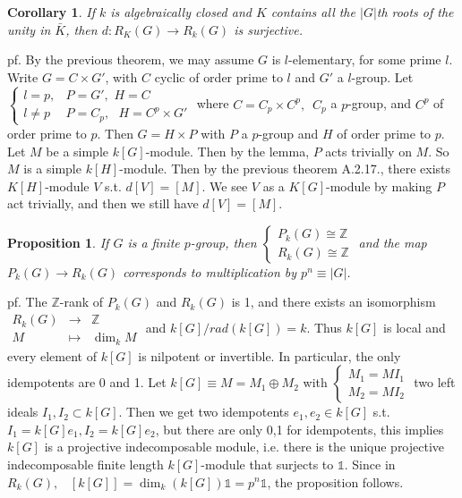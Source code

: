 \documentclass[12pt,letterpaper]{report}
\newtheorem{proposition}{Proposition}[section]
\newtheorem{corollary}{Corollary}[section]
\begin{document}
\begin{corollary}If $k$ is algebraically closed and $K$ contains all the $|G|$th roots of the unity in $\bar{K}$, then $d:R_{K}(G)\rightarrow R_{k}(G)$ is surjective.\end{corollary}
pf. By the previous theorem, we may assume $G$ is $l$-elementary, for some prime $l$. Write $G=C\times G'$, with $C$ cyclic of order prime to $l$ and $G'$ a $l$-group. Let $\left\{\begin{array}{rr}l=p,&P=G',\,\,H=C\\l\neq p& P=C_{p},\,\,\,\,H=C^{p}\times G'\end{array}\right.$ where $C=C_{p}\times C^{p},\,\,\,C_{p}$ a $p$-group, and $C^{p}$ of order prime to $p$. Then $G=H\times P$ with $P$ a $p$-group and $H$ of order prime to $p$. Let $M$ be a simple $k[G]$-module. Then by the lemma, $P$ acts trivially on $M$. So $M$ is a simple $k[H]$-module. Then by the previous theorem A.2.17., there exists $K[H]$-module $V$ s.t. $d[V]=[M]$. We see $V$ as a $K[G]$-module by making $P$ act trivially, and then we still have $d[V]=[M]$.
\begin{proposition}If $G$ is a finite $p$-group, then $\left\{\begin{array}{r}P_{k}(G)\cong\mathbb{Z}\\R_{k}(G)\cong\mathbb{Z}\end{array}\right.$ and the map $P_{k}(G)\rightarrow R_{k}(G)$ corresponds to multiplication by $p^{n}\equiv|G|$.\end{proposition}
pf. The $\mathbb{Z}$-rank of $P_{k}(G)$ and $R_{k}(G)$ is 1, and there exists an isomorphism $\begin{array}{rrr}R_{k}(G)&\rightarrow&\mathbb{Z}\\M&\mapsto&\dim_{k}M\end{array}$ and $k[G]/rad(k[G])=k$. Thus $k[G]$ is local and every element of $k[G]$ is nilpotent or invertible. In particular, the only idempotents are 0 and 1. Let $k[G]\equiv M=M_{1}\oplus M_{2}$ with $\left\{\begin{array}{r}M_{1}=MI_{1}\\M_{2}=MI_{2}\end{array}\right.$ two left ideals $I_{1},I_{2}\subset k[G]$. Then we get two idempotents $e_{1},e_{2}\in k[G]$ s.t. $I_{1}=k[G]e_{1},I_{2}=k[G]e_{2}$, but there are only 0,1 for idempotents, this implies $k[G]$ is a projective indecomposable module, i.e. there is the unique projective indecomposable finite length $k[G]$-module that surjects to $\mathbb{1}$. Since in $R_{k}(G),\,\,\,\,\,[k[G]]=\dim_{k}(k[G])\mathbb{1}=p^{n}\mathbb{1}$, the proposition follows.
\end{document}

